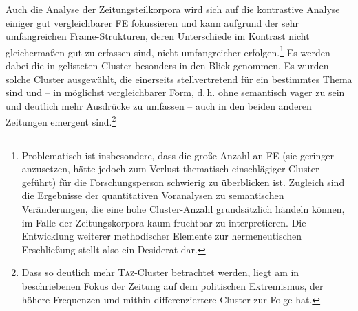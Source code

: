 Auch die Analyse der Zeitungsteilkorpora wird sich auf die kontrastive Analyse einiger gut vergleichbarer FE fokussieren und kann aufgrund der sehr umfangreichen Frame-Strukturen, deren Unterschiede im Kontrast nicht gleichermaßen gut zu erfassen sind, nicht umfangreicher erfolgen.\footnote{Problematisch ist insbesondere, dass die große Anzahl an FE (sie geringer anzusetzen, hätte jedoch zum Verlust thematisch einschlägiger Cluster geführt) für die Forschungsperson schwierig zu überblicken ist. Zugleich sind die Ergebnisse der quantitativen Voranalysen zu semantischen Veränderungen, die eine hohe Cluster-Anzahl grundsätzlich händeln können, im Falle der Zeitungskorpora kaum fruchtbar zu interpretieren. Die Entwicklung weiterer methodischer Elemente zur hermeneutischen Erschließung stellt also ein Desiderat dar.} Es werden dabei die in  gelisteten Cluster besonders in den Blick genommen. Es wurden solche Cluster ausgewählt, die einerseits stellvertretend für ein bestimmtes Thema sind und -- in möglichst vergleichbarer Form, d.\,h. ohne semantisch vager zu sein und deutlich mehr Ausdrücke zu umfassen -- auch in den beiden anderen Zeitungen emergent sind.\footnote{Dass so deutlich mehr \textsc{Taz}-Cluster betrachtet werden, liegt am in  beschriebenen Fokus der Zeitung auf dem politischen Extremismus, der höhere Frequenzen und mithin differenziertere Cluster zur Folge hat.}

